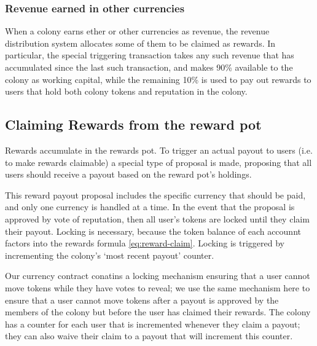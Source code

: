 \subsubsection*{Revenue earned in other currencies}
When a colony earns ether or other currencies as revenue, the revenue distribution system allocates some of them to be claimed as rewards. In particular, the special triggering transaction takes any such revenue that has accumulated since the last such transaction, and makes 90\% available to the colony as working capital, while the remaining 10\% is used to pay out rewards to users that hold both colony tokens and reputation in the colony. 

\begin{center}
\end{center}

\subsection{Claiming Rewards from the reward pot}
Rewards accumulate in the rewards pot. To trigger an actual payout to users (i.e. to make rewards claimable) a special type of proposal is made, proposing that all users should receive a payout based on the reward pot's holdings. 

This reward payout proposal includes the specific currency that should be paid, and only one currency is handled at a time. In the event that the proposal is approved by vote of reputation, then all user's tokens are locked until they claim their payout. Locking is necessary, because the token balance of each accounnt factors into the rewards formula \eqref{eq:reward-claim}. Locking is triggered by incrementing the colony's `most recent payout' counter. 

Our currency contract conatins a locking mechanism ensuring that a user cannot move tokens while they have votes to reveal; we use the same mechanism here to ensure that a user cannot move tokens after a payout is approved by the members of the colony but before the user has claimed their rewards. The colony has a counter for each user that is incremented whenever they claim a payout; they can also waive their claim to a payout that will increment this counter.  

